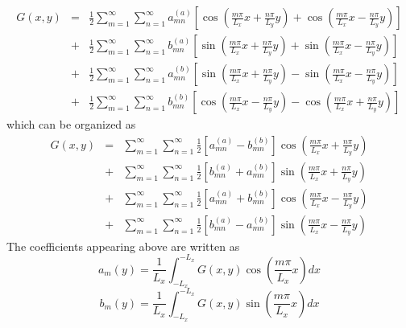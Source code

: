 \documentclass{article}
\begin{document}
\begin{eqnarray*}
  G (x, y) & = & \frac{1}{2} \sum_{m = 1}^{\infty} \sum_{n = 1}^{\infty} a_{m
  n}^{(a)} \left[ \cos \left( \frac{m \pi}{L_x} x + \frac{n \pi}{L_y} y
  \right) + \cos \left( \frac{m \pi}{L_x} x - \frac{n \pi}{L_y} y \right)
  \right]\\
  & + & \frac{1}{2} \sum_{m = 1}^{\infty} \sum_{n = 1}^{\infty} b_{m n}^{(a)}
  \left[ \sin \left( \frac{m \pi}{L_x} x + \frac{n \pi}{L_y} y \right) + \sin
  \left( \frac{m \pi}{L_x} x - \frac{n \pi}{L_y} y \right) \right]\\
  & + & \frac{1}{2} \sum_{m = 1}^{\infty} \sum_{n = 1}^{\infty} a_{m n}^{(b)}
  \left[ \sin \left( \frac{m \pi}{L_x} x + \frac{n \pi}{L_y} y \right) - \sin
  \left( \frac{m \pi}{L_x} x - \frac{n \pi}{L_y} y \right) \right]\\
  & + & \frac{1}{2} \sum_{m = 1}^{\infty} \sum_{n = 1}^{\infty} b_{m n}^{(b)}
  \left[ \cos \left( \frac{m \pi}{L_x} x - \frac{n \pi}{L_y} y \right) - \cos
  \left( \frac{m \pi}{L_x} x + \frac{n \pi}{L_y} y \right) \right]
\end{eqnarray*}
which can be organized as
\begin{eqnarray}
  G (x, y) & = & \sum_{m = 1}^{\infty} \sum_{n = 1}^{\infty} \frac{1}{2} [a_{m
  n}^{(a)} - b_{m n}^{(b)}] \cos \left( \frac{m \pi}{L_x} x + \frac{n
  \pi}{L_y} y \right) \nonumber\\
  & + & \sum_{m = 1}^{\infty} \sum_{n = 1}^{\infty} \frac{1}{2} [b_{m
  n}^{(a)} + a_{m n}^{(b)}] \sin \left( \frac{m \pi}{L_x} x + \frac{n
  \pi}{L_y} y \right) \nonumber\\
  & + & \sum_{m = 1}^{\infty} \sum_{n = 1}^{\infty} \frac{1}{2} [a_{m
  n}^{(a)} + b_{m n}^{(b)}] \cos \left( \frac{m \pi}{L_x} x - \frac{n
  \pi}{L_y} y \right) \nonumber\\
  & + & \sum_{m = 1}^{\infty} \sum_{n = 1}^{\infty} \frac{1}{2} [b_{m
  n}^{(a)} - a_{m n}^{(b)}] \sin \left( \frac{m \pi}{L_x} x - \frac{n
  \pi}{L_y} y \right)  \label{11-9-4}
\end{eqnarray}
The coefficients appearing above are written as
\begin{equation}
  a_m (y) = \frac{1}{L_x} \int_{- L_x}^{- L_x} G (x, y) \cos \left( \frac{m
  \pi}{L_x} x \right) d x
\end{equation}
\begin{equation}
  b_m (y) = \frac{1}{L_x} \int_{- L_x}^{- L_x} G (x, y) \sin \left( \frac{m
  \pi}{L_x} x \right) d x
\end{equation}
\end{document}
